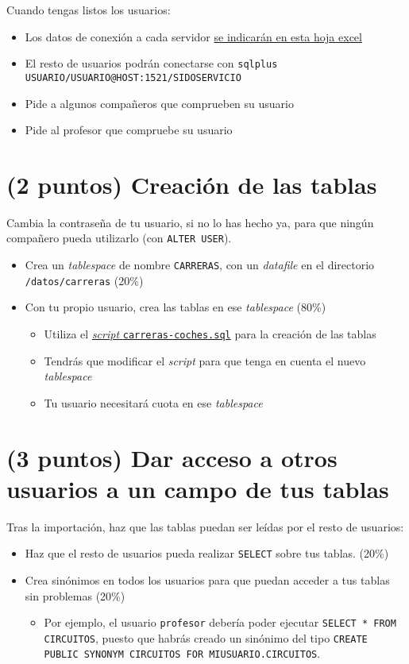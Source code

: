 \documentclass[a4paper]{article}
\begin{document}
Cuando tengas listos los usuarios:
\begin{itemize}
\item Los datos de conexión a cada servidor \href{https://docs.google.com/spreadsheets/d/17A6TpGOixGVVZr1VlocN6ZhMuKqmQjD3XedyIne4ows/edit\#gid=0}{se indicarán en esta hoja excel}
\item El resto de usuarios podrán conectarse con \texttt{sqlplus USUARIO/USUARIO@HOST:1521/SIDOSERVICIO}
\item Pide a algunos compañeros que comprueben su usuario
\item Pide al profesor que compruebe su usuario
\end{itemize}

\section{(2 puntos) Creación de las tablas}
\label{sec:org0000009}
Cambia la contraseña de tu usuario, si no lo has hecho ya, para que ningún compañero pueda utilizarlo (con \texttt{ALTER USER}).

\begin{itemize}
\item Crea un \emph{tablespace} de nombre \texttt{CARRERAS}, con un \emph{datafile} en el directorio \texttt{/datos/carreras} (20\%)
\item Con tu propio usuario, crea las tablas en ese \emph{tablespace} (80\%)
\begin{itemize}
\item Utiliza el \href{https://raw.githubusercontent.com/alvarogonzalezsotillo/apuntes-clase/gh-pages/sistemas-gestores-bbdd-asir2/apuntes/1/sql/carreras-coches.sql}{\emph{script} \texttt{carreras-coches.sql}} para la creación de las tablas
\item Tendrás que modificar el \emph{script} para que tenga en cuenta el nuevo \emph{tablespace}
\item Tu usuario necesitará cuota en ese \emph{tablespace}
\end{itemize}
\end{itemize}

\section{(3 puntos) Dar acceso a otros usuarios a un campo de tus tablas}
\label{sec:org000000c}
Tras la importación, haz que las tablas puedan ser leídas por el resto de usuarios:
\begin{itemize}
\item Haz que el resto de usuarios pueda realizar \texttt{SELECT} sobre tus tablas. (20\%)
\item Crea sinónimos en todos los usuarios para que puedan acceder a tus tablas sin problemas (20\%)
\begin{itemize}
\item Por ejemplo, el usuario \texttt{profesor} debería poder ejecutar \texttt{SELECT * FROM CIRCUITOS}, puesto que habrás creado un sinónimo del tipo \texttt{CREATE PUBLIC SYNONYM CIRCUITOS FOR MIUSUARIO.CIRCUITOS}.
\end{itemize}
\end{itemize}
\end{document}
